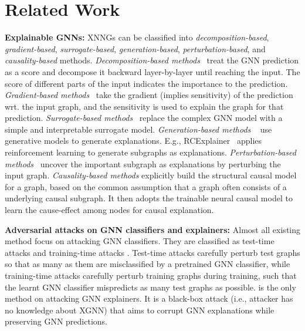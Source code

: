 \section{Related Work}
\label{sec:related}

\vspace{-2mm}
{\bf Explainable GNNs:} XNNGs can be classified into \textit{decomposition-based}, \textit{gradient-based},  \textit{surrogate-based}, \textit{generation-based},  \textit{perturbation-based}, and \textit{causality-based} methods. \textit{Decomposition-based methods}~\citep{schnake2021higher,feng2023degree} treat the GNN prediction  as a score and decompose it backward layer-by-layer until reaching the input. The score of different parts of the input indicates the importance to the prediction. 
\textit{Gradient-based methods}~\citep{baldassarre2019explainability,pope2019explainability} 
take the gradient (implies sensitivity) of the prediction wrt. the input graph, and the sensitivity is used to explain the graph for that prediction.
\textit{Surrogate-based methods}~\citep{vu2020pgm,pereira2023distill} replace the complex GNN model with a simple and interpretable surrogate model.
\textit{Generation-based methods} 
~\citep{GEM,sui2022causal,shan2021reinforcement/RGExplainer,Wang_2023/RCExplainer}
use generative models to generate explanations. 
E.g., RCExplainer~\citep{Wang_2023/RCExplainer} 
applies reinforcement learning to generate subgraphs as explanations. 
\textit{Perturbation-based methods}~\citep{GNNEx19,DBLP:journals/corr/abs-2011-04573/PGExplainer,wang2021towards,funke2022zorro}
uncover the important subgraph as explanations by perturbing the input graph. 
\emph{Causality-based methods} \citep{behnam2024graph} explicitly build the structural causal model for a graph, based on the common assumption that a graph often consists of a underlying causal  subgraph. It then adopts the trainable neural causal model \citep{xia2021causal} to learn the cause-effect among nodes for causal explanation. 



{\bf Adversarial attacks on GNN classifiers and explainers:}
Almost all existing method  focus on attacking GNN classifiers. 
 They are classified as test-time attacks
\citep{dai2018adversarial,zugner2018adversarial,ma2020towards,mu2021hard,wang2022bandits,wang2023turning,wang2024efficient} and training-time attacks
\citep{xu2019topology,zugner2019adversarial,wang2019attacking,zhang2021backdoor,wang2023turning}. 
Test-time attacks carefully perturb test graphs  
so that as many as them are misclassified by a pretrained GNN classifier, 
while training-time attacks carefully perturb training graphs during training, such that the learnt GNN classifier mispredicts as many test graphs as possible. 
\citep{li2024graph} is the only method on attacking GNN explainers.  
It is a black-box attack (i.e., attacker has no knowledge about XGNN) that aims to corrupt GNN explanations while preserving GNN predictions.

